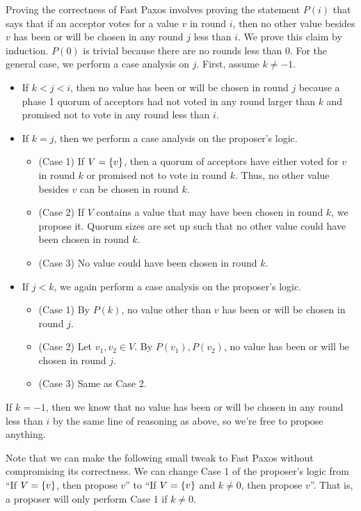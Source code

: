 \documentclass{mwhittaker}
\begin{document}
Proving the correctness of Fast Paxos involves proving the statement $P(i)$
that says that if an acceptor votes for a value $v$ in round $i$, then no
other value besides $v$ has been or will be chosen in any round $j$ less than
$i$. We prove this claim by induction. $P(0)$ is trivial because there are no
rounds less than $0$. For the general case, we perform a case analysis on $j$.
First, assume $k \neq -1$.
\begin{itemize}
  \item
    If $k < j < i$, then no value has been or will be chosen in round $j$
    because a phase 1 quorum of acceptors had not voted in any round larger
    than $k$ and promised not to vote in any round less than $i$.

  \item
    If $k = j$, then we perform a case analysis on the proposer's logic.
    \begin{itemize}
      \item
        (Case 1) If $V = \{v\}$, then a quorum of acceptors have either voted
        for $v$ in round $k$ or promised not to vote in round $k$. Thus, no
        other value besides $v$ can be chosen in round $k$.
      \item
        (Case 2) If $V$ contains a value that may have been chosen in round
        $k$, we propose it. Quorum sizes are set up such that no other value
        could have been chosen in round $k$.
      \item
        (Case 3) No value could have been chosen in round $k$.
    \end{itemize}

  \item
    If $j < k$, we again perform a case analysis on the proposer's logic.
    \begin{itemize}
      \item
        (Case 1) By $P(k)$, no value other than $v$ has been or will be chosen
        in round $j$.
      \item
        (Case 2) Let $v_1, v_2 \in V$. By $P(v_1), P(v_2)$, no value has been
        or will be chosen in round $j$.
      \item
        (Case 3) Same as Case 2.
    \end{itemize}
\end{itemize}
If $k = -1$, then we know that no value has been or will be chosen in any round
less than $i$ by the same line of reasoning as above, so we're free to propose
anything.

Note that we can make the following small tweak to Fast Paxos without
compromising its correctness. We can change Case 1 of the proposer's logic from
``If $V = \{v\}$, then propose $v$'' to ``If $V = \{v\}$ and $k \neq 0$,
then propose $v$''. That is, a proposer will only perform Case 1 if $k \neq 0$.
\end{document}
